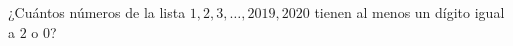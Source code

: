 ¿Cuántos números de la lista $1, 2, 3, \dots , 2019, 2020$ tienen al menos un dígito igual a $2$ o $0$?